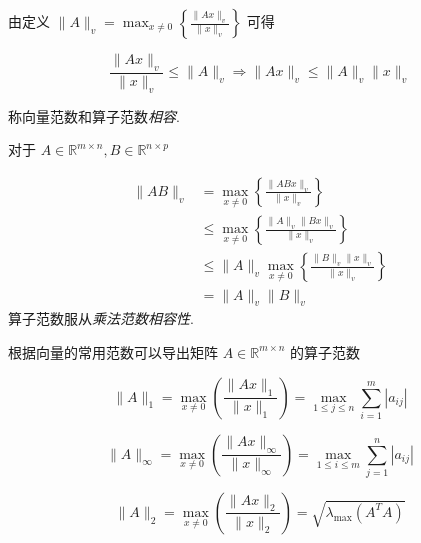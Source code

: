 由定义 $ \|A\|_{v}=\max _{x \neq 0}\left\{\frac{\|A x\|_{v}}{\|x\|_{v}}\right\} $ 可得

\begin{definition}[向量范数和算子范数相容]
    $$ \frac{\|A x\|_{v}}{\|x\|_{v}} \leq\|A\|_{v} \Rightarrow\|A x\|_{v} \leq\|A\|_{v}\|x\|_{v} $$

    称向量范数和算子范数\textit{相容}. 
\end{definition}

\begin{theorem}[算子范数服从乘法范数相容性]
   对于 $ A \in \mathbb{R}^{m \times n}, B \in \mathbb{R}^{n \times p} $

    $$\begin{aligned}
        \|A B\|_{v} &=\max _{x \neq 0}\left\{\frac{\|A B x\|_{v}}{\|x\|_{v}}\right\} \\
        & \leq \max _{x \neq 0}\left\{\frac{\|A\|_{v}\|B x\|_{v}}{\|x\|_{v}}\right\} \\
        & \leq\|A\|_{v} \max _{x \neq 0}\left\{\frac{\|B\|_{v}\|x\|_{v}}{\|x\|_{v}}\right\} \\
        & =\|A\|_{v}\|B\|_{v}
    \end{aligned}$$
    算子范数服从\textit{乘法范数相容性}.
\end{theorem}

根据向量的常用范数可以导出矩阵 $ A \in \mathbb{R}^{m \times n} $ 的算子范数

\begin{definition}[$A$的列范数]
    $$ \|A\|_{1}=\max _{x \neq 0}\left(\frac{\|A x\|_{1}}{\|x\|_{1}}\right)=\max _{1 \leq j \leq n} \sum_{i=1}^{m}\left|a_{i j}\right| $$
\end{definition}

\begin{definition}[$A$的行范数]
    $$ \|A\|_{\infty}=\max _{x \neq 0}\left( \frac{\|A x\|_{\infty}}{\|x\|_{\infty}}    \right)=\max _{1 \leq i \leq m} \sum_{j=1}^{n}\left|a_{i j}\right| $$
\end{definition}

\begin{definition}[$A$的2−范数]
    $$ \|A\|_{2}=\max _{x \neq 0}\left( \frac{\|A x\|_{2}}{\|x\|_{2}}  \right)=\sqrt{\lambda_{\max }\left(A^{T} A\right)} $$
\end{definition}


